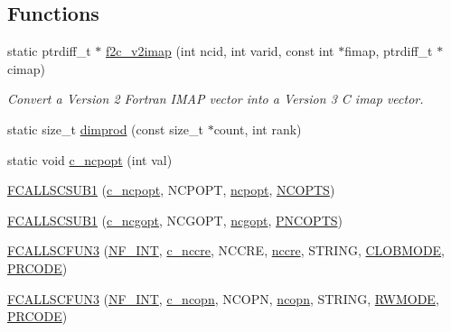 \subsection*{Functions}
\begin{DoxyCompactItemize}
\item 
static ptrdiff\+\_\+t $\ast$ \hyperlink{fort-v2compat_8c_a0c06fd2f546418d0ed6fcfdc21340157}{f2c\+\_\+v2imap} (int ncid, int varid, const int $\ast$fimap, ptrdiff\+\_\+t $\ast$cimap)
\begin{DoxyCompactList}\small\item\em Convert a Version 2 Fortran I\+M\+AP vector into a Version 3 C imap vector. \end{DoxyCompactList}\item 
static size\+\_\+t \hyperlink{fort-v2compat_8c_aa8270ec7619e957c0db032b4eb46c910}{dimprod} (const size\+\_\+t $\ast$count, int rank)
\item 
static void \hyperlink{fort-v2compat_8c_ab008e5bfc98a80ca25189628e76e3ebf}{c\+\_\+ncpopt} (int val)
\item 
\hyperlink{fort-v2compat_8c_a53850b774513b597f2d9080a0869f01a}{F\+C\+A\+L\+L\+S\+C\+S\+U\+B1} (\hyperlink{nf__v2compat_8c_a94488ba6a21805a4d1f6f8e6c0c41c5e}{c\+\_\+ncpopt}, N\+C\+P\+O\+PT, \hyperlink{nf__fortv2_8f90_aa99b1352748c769427ead3bfaf123fff}{ncpopt}, \hyperlink{fort-v2compat_8c_ad34fd007826863dc1084c1c893ce5934}{N\+C\+O\+P\+TS})
\item 
\hyperlink{fort-v2compat_8c_ae3a654f180e14021674a31a166b7d6a8}{F\+C\+A\+L\+L\+S\+C\+S\+U\+B1} (\hyperlink{nf__v2compat_8c_aac642849eafe9806b7b660bbe5c50cd1}{c\+\_\+ncgopt}, N\+C\+G\+O\+PT, \hyperlink{nf__fortv2_8f90_a4fe1ac0350a63230cc17e880d496efa3}{ncgopt}, \hyperlink{fort-v2compat_8c_ad28923cfdb7eaecc17fef3711c74befc}{P\+N\+C\+O\+P\+TS})
\item 
\hyperlink{fort-v2compat_8c_a3da73ae9b802d64c18e850a7320091a7}{F\+C\+A\+L\+L\+S\+C\+F\+U\+N3} (\hyperlink{ncfortran_8h_aec6fe8ae8c73cf5133d4ed64f86ff028}{N\+F\+\_\+\+I\+NT}, \hyperlink{nf__v2compat_8c_af9a99cd260c5779074591f8e55582d26}{c\+\_\+nccre}, N\+C\+C\+RE, \hyperlink{nf__fortv2_8f90_a395384eea56bdad4a53b55df6d6e78d2}{nccre}, S\+T\+R\+I\+NG, \hyperlink{fort-v2compat_8c_abd5253773c995afc2eed8dee4a76a552}{C\+L\+O\+B\+M\+O\+DE}, \hyperlink{fort-v2compat_8c_ae2352f39cbd25bcaf1bedbbb12db73fe}{P\+R\+C\+O\+DE})
\item 
\hyperlink{fort-v2compat_8c_a2b3527c7932d252430e05f13777cfe55}{F\+C\+A\+L\+L\+S\+C\+F\+U\+N3} (\hyperlink{ncfortran_8h_aec6fe8ae8c73cf5133d4ed64f86ff028}{N\+F\+\_\+\+I\+NT}, \hyperlink{nf__v2compat_8c_a3144811f2328f7e62be2e0e4484aab43}{c\+\_\+ncopn}, N\+C\+O\+PN, \hyperlink{nf__fortv2_8f90_a43dce57f3c98cba43a7394b48ecd3184}{ncopn}, S\+T\+R\+I\+NG, \hyperlink{fort-v2compat_8c_a36ab2e26d67d11b7bfcb8843dc4bfb43}{R\+W\+M\+O\+DE}, \hyperlink{fort-v2compat_8c_ae2352f39cbd25bcaf1bedbbb12db73fe}{P\+R\+C\+O\+DE})

\end{DoxyCompactItemize}
